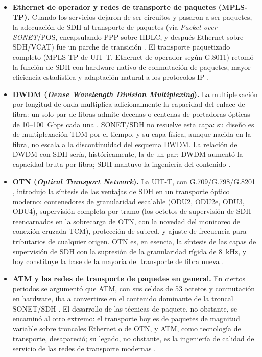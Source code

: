 \documentclass[12pt,a4paper]{article}
\begin{document}
\begin{itemize}
    \item \textbf{Ethernet de operador y redes de transporte de paquetes (MPLS-TP).} Cuando los servicios dejaron de ser circuitos y pasaron a ser paquetes, la adecuación de SDH al transporte de paquetes (vía \emph{Packet over SONET}/POS, encapsulando PPP sobre HDLC, y después Ethernet sobre SDH/VCAT) fue un parche de transición \cite{stallings2004}. El transporte paquetizado completo (MPLS-TP de UIT-T, Ethernet de operador según G.8011) retomó la función de SDH con hardware nativo de conmutación de paquetes, mayor eficiencia estadística y adaptación natural a los protocolos IP \cite{kurose2017, ituG803}.
    \item \textbf{DWDM (\emph{Dense Wavelength Division Multiplexing}).} La multiplexación por longitud de onda multiplica adicionalmente la capacidad del enlace de fibra: un solo par de fibras admite decenas o centenas de portadoras ópticas de 10--100~Gbps cada una \cite{ituG694}. SONET/SDH no resuelve esta capa: su diseño es de multiplexación TDM por el tiempo, y su capa física, aunque nacida en la fibra, no escala a la discontinuidad del esquema DWDM. La relación de DWDM con SDH sería, históricamente, la de un par: DWDM aumentó la capacidad bruta por fibra; SDH mantuvo la ingeniería del contenido \cite{ituG694, ituotn}.
    \item \textbf{OTN (\emph{Optical Transport Network}).} La UIT-T, con G.709/G.798/G.8201 \cite{ituotn}, introdujo la síntesis de las ventajas de SDH en un transporte óptico moderno: contenedores de granularidad escalable (ODU2, ODU2e, ODU3, ODU4), supervisión completa por tramo (los octetos de supervisión de SDH reencarnados en la sobrecarga de OTN, con la novedad del monitoreo de conexión cruzada TCM), protección de subred, y ajuste de frecuencia para tributarios de cualquier origen. OTN es, en esencia, la síntesis de las capas de supervisión de SDH con la supresión de la granularidad rígida de 8~kHz, y hoy constituye la base de la mayoría del transporte de fibra nueva \cite{ituotn}.
    \item \textbf{ATM y las redes de transporte de paquetes en general.} En ciertos periodos se argumentó que ATM, con sus celdas de 53 octetos y conmutación en hardware, iba a convertirse en el contenido dominante de la troncal SONET/SDH \cite{tanenbaum2012}. El desarrollo de las técnicas de paquete, no obstante, se encaminó al otro extremo: el transporte hoy es de paquetes de magnitud variable sobre troncales Ethernet o de OTN, y ATM, como tecnología de transporte, desapareció; su legado, no obstante, es la ingeniería de calidad de servicio de las redes de transporte modernas \cite{kurose2017}.
\end{itemize}
\end{document}
